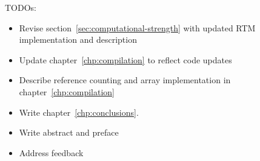 TODOs:
\begin{itemize}
  \item Revise section~\ref{sec:computational-strength} with updated RTM implementation and description
  \item Update chapter~\ref{chp:compilation} to reflect code updates
  \item Describe reference counting and array implementation in chapter~\ref{chp:compilation}
  \item Write chapter~\ref{chp:conclusions}.
  \item Write abstract and preface
  \item Address feedback
\end{itemize}